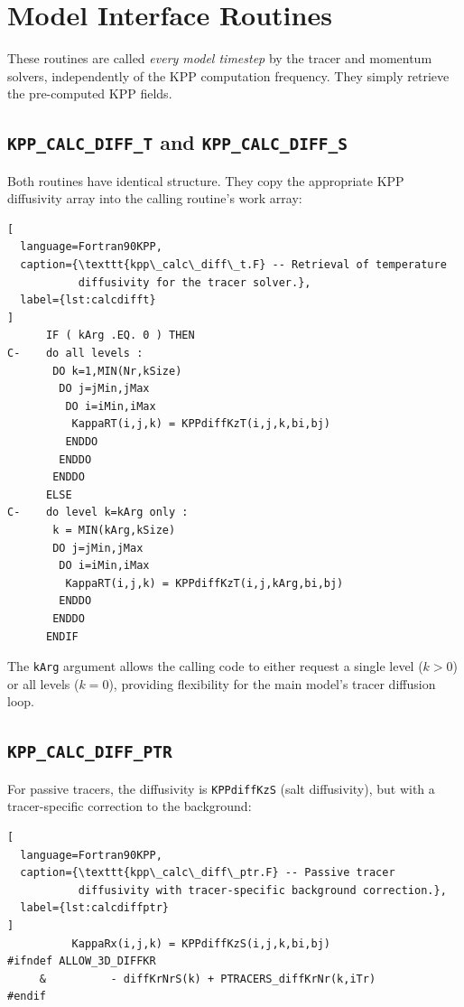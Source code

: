 \documentclass[12pt,letterpaper]{article}
\begin{document}
\section{Model Interface Routines}  
  
These routines are called \textit{every model timestep} by the  
tracer and momentum solvers, independently of the KPP computation  
frequency. They simply retrieve the pre-computed KPP fields.  
  
\subsection{\texttt{KPP\_CALC\_DIFF\_T} and \texttt{KPP\_CALC\_DIFF\_S}}  
  
Both routines have identical structure. They copy the appropriate  
KPP diffusivity array into the calling routine's work array:  
  
\begin{lstlisting}[  
  language=Fortran90KPP,  
  caption={\texttt{kpp\_calc\_diff\_t.F} -- Retrieval of temperature  
           diffusivity for the tracer solver.},  
  label={lst:calcdifft}  
]  
      IF ( kArg .EQ. 0 ) THEN  
C-    do all levels :  
       DO k=1,MIN(Nr,kSize)  
        DO j=jMin,jMax  
         DO i=iMin,iMax  
          KappaRT(i,j,k) = KPPdiffKzT(i,j,k,bi,bj)  
         ENDDO  
        ENDDO  
       ENDDO  
      ELSE  
C-    do level k=kArg only :  
       k = MIN(kArg,kSize)  
       DO j=jMin,jMax  
        DO i=iMin,iMax  
         KappaRT(i,j,k) = KPPdiffKzT(i,j,kArg,bi,bj)  
        ENDDO  
       ENDDO  
      ENDIF  
\end{lstlisting}  
  
The \texttt{kArg} argument allows the calling code to either request  
a single level ($k > 0$) or all levels ($k = 0$), providing  
flexibility for the main model's tracer diffusion loop.  
  
\subsection{\texttt{KPP\_CALC\_DIFF\_PTR}}  
  
For passive tracers, the diffusivity is \texttt{KPPdiffKzS} (salt  
diffusivity), but with a tracer-specific correction to the background:  
  
\begin{lstlisting}[  
  language=Fortran90KPP,  
  caption={\texttt{kpp\_calc\_diff\_ptr.F} -- Passive tracer  
           diffusivity with tracer-specific background correction.},  
  label={lst:calcdiffptr}  
]  
          KappaRx(i,j,k) = KPPdiffKzS(i,j,k,bi,bj)  
#ifndef ALLOW_3D_DIFFKR  
     &          - diffKrNrS(k) + PTRACERS_diffKrNr(k,iTr)  
#endif  
\end{lstlisting}  
  
\end{document}
